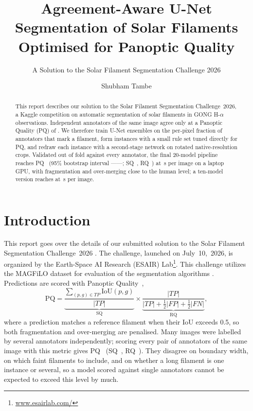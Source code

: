 \documentclass[sigconf]{acmart}
\providecommand{\uncCILo}{--}\providecommand{\uncCIHi}{--}\providecommand{\uncRulesCILo}{--}
\begin{document}
\title{Agreement-Aware U-Net Segmentation of Solar Filaments Optimised for Panoptic Quality}
\subtitle{A Solution to the Solar Filament Segmentation Challenge 2026} %


\author{Shubham Tambe}

\begin{abstract}
    This report describes our solution to the Solar Filament Segmentation Challenge~2026, a Kaggle competition on automatic segmentation of solar filaments in GONG H-$\alpha$ observations. Independent annotators of the same image agree only at a Panoptic Quality (PQ) of \humanPQ{}. We therefore train U-Net ensembles on the per-pixel fraction of annotators that mark a filament, form instances with a small rule set tuned directly for PQ, and redraw each instance with a second-stage network on rotated native-resolution crops. Validated out of fold against every annotator, the final 20-model pipeline reaches PQ~ (95\% bootstrap interval \uncCILo--\uncCIHi; SQ~, RQ~) at \effFinalT{}\,s per image on a laptop GPU, with fragmentation and over-merging close to the human level; a ten-model version reaches \effPQFastRef{} at \effTFastRef{}\,s per image.
\end{abstract}

\maketitle


\section{Introduction}
    This report goes over the details of our submitted solution to the Solar Filament Segmentation Challenge~2026 \cite{filament-segmentation-2026}. The challenge, launched on July~10,~2026, is organized by the Earth-Space AI Research (ESAIR) Lab\footnote{\href{https://www.esairlab.com/home}{www.esairlab.com/}}. This challenge utilizes the MAGFiLO dataset for evaluation of the segmentation algorithms \cite{ahmadzadeh2024dataset}. Predictions are scored with Panoptic Quality~\cite{kirillov2019panoptic},
\begin{equation}
\mathrm{PQ}=\underbrace{\frac{\sum_{(p,g)\in TP}\mathrm{IoU}(p,g)}{|TP|}}_{\text{SQ}}\times
\underbrace{\frac{|TP|}{|TP|+\tfrac12|FP|+\tfrac12|FN|}}_{\text{RQ}},
\end{equation}
where a prediction matches a reference filament when their IoU exceeds 0.5, so both fragmentation and over-merging are penalised. Many images were labelled by several annotators independently; scoring every pair of annotators of the same image with this metric gives PQ~\humanPQ{} (SQ~\humanSQ{}, RQ~\humanRQ{}). They disagree on boundary width, on which faint filaments to include, and on whether a long filament is one instance or several, so a model scored against single annotators cannot be expected to exceed this level by much.
\end{document}
